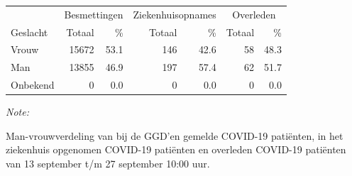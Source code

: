 \documentclass[
  english,
  man,floatsintext]{apa6}
\begin{document}
\begin{table}[H]
\centering\begingroup\fontsize{11}{13}\selectfont

\begin{threeparttable}
\begin{tabular}{lrrrrrr}
\toprule
\multicolumn{1}{c}{ } & \multicolumn{2}{c}{Besmettingen} & \multicolumn{2}{c}{Ziekenhuisopnames} & \multicolumn{2}{c}{Overleden} \\
\cmidrule(l{3pt}r{3pt}){2-3} \cmidrule(l{3pt}r{3pt}){4-5} \cmidrule(l{3pt}r{3pt}){6-7}
Geslacht & Totaal & \% & Totaal & \% & Totaal & \%\\
\midrule
Vrouw & 15672 & 53.1 & 146 & 42.6 & 58 & 48.3\\
Man & 13855 & 46.9 & 197 & 57.4 & 62 & 51.7\\
Onbekend & 0 & 0.0 & 0 & 0.0 & 0 & 0.0\\
\bottomrule
\end{tabular}
\begin{tablenotes}
\item \textit{Note: } 
\item Man-vrouwverdeling van bij de GGD’en gemelde COVID-19 patiënten, in het ziekenhuis opgenomen COVID-19 patiënten en overleden COVID-19 patiënten van 13 september t/m 27 september 10:00 uur.
\end{tablenotes}
\end{threeparttable}
\endgroup{}
\end{table}
\newpage
\end{document}
